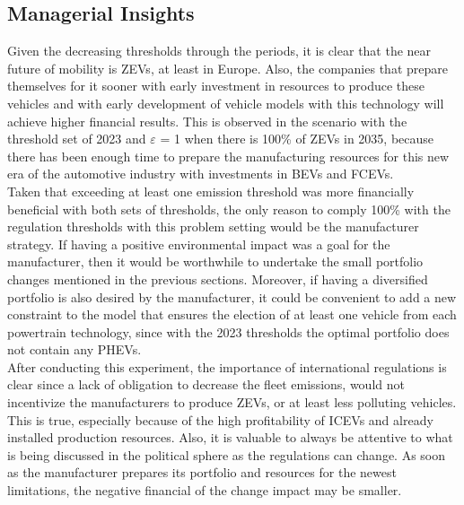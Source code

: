 \subsection{Managerial Insights}\label{managerialinsightsexperiment2}
Given the decreasing thresholds through the periods, it is clear that the near future of mobility is \gls{ZEV}s, at least in Europe. Also, the companies that prepare themselves for it sooner with early investment in resources to produce these vehicles and with early development of vehicle models with this technology will achieve higher financial results. This is observed in the scenario with the threshold set of 2023 and $\varepsilon$ = 1 when there is 100\% of \gls{ZEV}s in 2035, because there has been enough time to prepare the manufacturing resources for this new era of the automotive industry with investments in \gls{BEV}s and \gls{FCEV}s.\\
Taken that exceeding at least one emission threshold was more financially beneficial with both sets of thresholds, the only reason to comply 100\% with the regulation thresholds with this problem setting would be the manufacturer strategy. If having a positive environmental impact was a goal for the manufacturer, then it would be worthwhile to undertake the small portfolio changes mentioned in the previous sections. Moreover, if having a diversified portfolio is also desired by the manufacturer, it could be convenient to add a new constraint to the model that ensures the election of at least one vehicle from each powertrain technology, since with the 2023 thresholds the optimal portfolio does not contain any \gls{PHEV}s.\\
After conducting this experiment, the importance of international regulations is clear since a lack of obligation to decrease the fleet emissions, would not incentivize the manufacturers to produce \gls{ZEV}s, or at least less polluting vehicles. This is true, especially because of the high profitability of \gls{ICEV}s and already installed production resources. Also, it is valuable to always be attentive to what is being discussed in the political sphere as the regulations can change. As soon as the manufacturer prepares its portfolio and resources for the newest limitations, the negative financial of the change impact may be smaller.